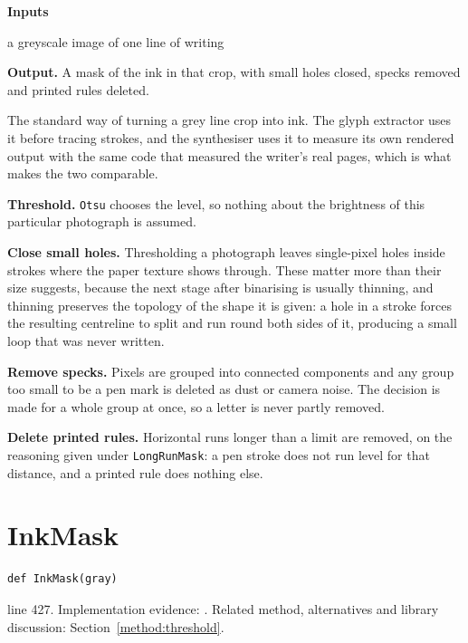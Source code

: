 \noindent\textbf{Inputs}
\begin{description}[leftmargin=2.2em,style=nextline,font=\normalfont\ttfamily]\setlength\itemsep{1pt}
  \item[{gray}] \normalfont a greyscale image of one line of writing
\end{description}

\noindent\textbf{Output.} A mask of the ink in that crop, with small holes closed, specks removed and printed rules deleted.


The standard way of turning a grey line crop into ink. The glyph extractor uses it before tracing strokes, and the synthesiser uses it to measure its own rendered output with the same code that measured the writer's real pages, which is what makes the two comparable.


\textbf{Threshold.} \texttt{Otsu} chooses the level, so nothing about the brightness of this particular photograph is assumed.

\textbf{Close small holes.} Thresholding a photograph leaves single-pixel holes inside strokes where the paper texture shows through. These matter more than their size suggests, because the next stage after binarising is usually thinning, and thinning preserves the topology of the shape it is given: a hole in a stroke forces the resulting centreline to split and run round both sides of it, producing a small loop that was never written.

\textbf{Remove specks.} Pixels are grouped into connected components and any group too small to be a pen mark is deleted as dust or camera noise. The decision is made for a whole group at once, so a letter is never partly removed.

\textbf{Delete printed rules.} Horizontal runs longer than a limit are removed, on the reasoning given under \texttt{LongRunMask}: a pen stroke does not run level for that distance, and a printed rule does nothing else.



\section{InkMask}\label{fn:segment:InkMask}
\begin{lstlisting}[style=sig]
def InkMask(gray)
\end{lstlisting}
 line 427. Implementation evidence: \cite{code2026}. Related method, alternatives and library discussion: Section~\ref{method:threshold}.


